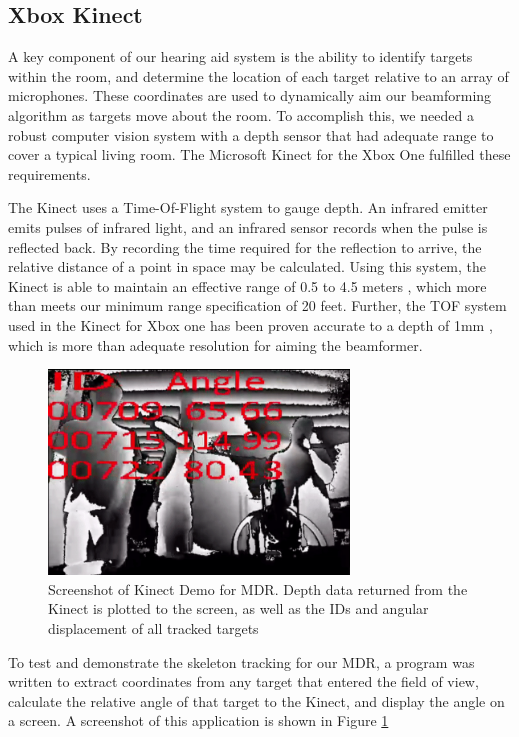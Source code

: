 \documentclass[10pt,journal,compsoc]{IEEEtran}
\begin{document}
\subsection{Xbox Kinect}

A key component of our hearing aid system is the ability to identify targets within the room, and determine the location of each target relative to an array of microphones. These coordinates are used to dynamically aim our beamforming algorithm as targets move about the room. To accomplish this, we needed a robust computer vision system with a depth sensor that had adequate range to cover a typical living room. The Microsoft Kinect for the Xbox One fulfilled these requirements.

The Kinect uses a Time-Of-Flight system to gauge depth. An infrared emitter emits pulses of infrared light, and an infrared sensor records when the pulse is reflected back. By recording the time required for the reflection to arrive, the relative distance of a point in space may be calculated. Using this system, the Kinect is able to maintain an effective range of 0.5 to 4.5 meters \cite{kinect_spec}, which more than meets our minimum range specification of 20 feet. Further, the TOF system used in the Kinect for Xbox one has been proven accurate to a depth of 1mm \cite{chen}, which is more than adequate resolution for aiming the beamformer.


\begin{figure}[!htbp]
    \centering
    \includegraphics[width=8cm]{kinect_test}
    \caption{Screenshot of Kinect Demo for MDR. Depth data returned from the Kinect is plotted to the screen, as well as the IDs and angular displacement of all tracked targets}
    \label{fig:kinect_demo}
\end{figure}

To test and demonstrate the skeleton tracking for our MDR, a program was written to extract coordinates from any target that entered the field of view, calculate the relative angle of that target to the Kinect, and display the angle on a screen. A screenshot of this application is shown in Figure \ref{fig:kinect_demo}
\end{document}
